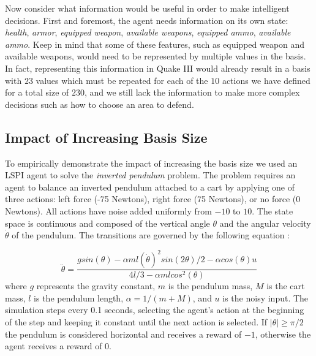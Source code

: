 Now consider what information would be useful in order to make intelligent decisions. First and foremost, the agent needs information on its own state: \emph{health}, \emph{armor}, \emph{equipped weapon}, \emph{available weapons}, \emph{equipped ammo}, \emph{available ammo}. Keep in mind that some of these features, such as equipped weapon and available weapons, would need to be represented by multiple values in the basis. In fact, representing this information in Quake III would already result in a basis with $23$ values which must be repeated for each of the $10$ actions we have defined for a total size of $230$, and we still lack the information to make more complex decisions such as how to choose an area to defend.

\subsection{Impact of Increasing Basis Size}

To empirically demonstrate the impact of increasing the basis size we used an LSPI agent to solve the \emph{inverted pendulum} problem. The problem requires an agent to balance an inverted pendulum attached to a cart by applying one of three actions: left force (-75 Newtons), right force (75 Newtons), or no force (0 Newtons). All actions have noise added uniformly from $-10$ to $10$. The state space is continuous and composed of the vertical angle $\theta$ and the angular velocity $\dot{\theta}$ of the pendulum. The transitions are governed by the following equation \cite{lspi}:

\begin{equation}
    \ddot{\theta} = \frac{g sin(\theta) - \alpha ml(\dot{\theta})^2 sin(2\theta)/2 - \alpha cos(\theta)u}{4l/3 - \alpha ml cos^2(\theta)}
\label{eq:pendulum}
\end{equation}
where $g$ represents the gravity constant, $m$ is the pendulum mass, $M$ is the cart mass, $l$ is the pendulum length, $\alpha = 1/(m + M)$, and $u$ is the noisy input. The simulation steps every 0.1 seconds, selecting the agent's action at the beginning of the step and keeping it constant until the next action is selected. If $|\theta| \geq \pi/2$ the pendulum is considered horizontal and receives a reward of $-1$, otherwise the agent receives a reward of 0.

